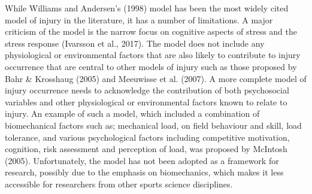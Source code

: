\documentclass[
  english,
  man,floatsintext]{apa6}
\begin{document}
While Williams and Andersen's (1998) model has been the most widely cited model of injury in the literature, it has a number of limitations.
A major criticism of the model is the narrow focus on cognitive aspects of stress and the stress response (Ivarsson et al., 2017).
The model does not include any physiological or environmental factors that are also likely to contribute to injury occurrence that are central to other models of injury such as those proposed by Bahr \& Krosshaug (2005) and Meeuwisse et al. (2007).
A more complete model of injury occurrence needs to acknowledge the contribution of both psychosocial variables and other physiological or environmental factors known to relate to injury.
An example of such a model, which included a combination of biomechanical factors such as; mechanical load, on field behaviour and skill, load tolerance, and various psychological factors including competitive motivation, cognition, risk assessment and perception of load, was proposed by McIntosh (2005).
Unfortunately, the model has not been adopted as a framework for research, possibly due to the emphasis on biomechanics, which makes it less accessible for researchers from other sports science disciplines.
\end{document}
